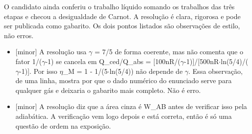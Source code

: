 \documentclass{article}%
\begin{document}
\newline%
O candidato ainda conferiu o trabalho líquido somando os trabalhos das três etapas e checou a desigualdade de Carnot. A resolução é clara, rigorosa e pode ser publicada como gabarito. Os dois pontos listados são observações de estilo, não erros.%
\begin{itemize}%
\item%
{[}minor{]} A resolução usa $\gamma$ = 7/5 de forma coerente, mas não comenta que o fator 1/($\gamma$-1) se cancela em Q\_ced/Q\_abs = {[}100nR/($\gamma$-1){]}/{[}500nR$\cdot$ln(5/4)/($\gamma$-1){]}. Por isso $\eta$\_M = 1 - 1/(5$\cdot$ln(5/4)) não depende de $\gamma$. Essa observação, de uma linha, mostra por que o dado numérico do enunciado serve para qualquer gás e deixaria o gabarito mais completo. Não é erro.%
\item%
{[}minor{]} A resolução diz que a área cinza é W\_AB antes de verificar isso pela adiabática. A verificação vem logo depois e está correta, então é só uma questão de ordem na exposição.%
\end{itemize}%
\end{document}

